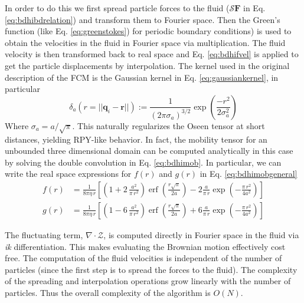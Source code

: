 \documentclass[ twoside,openright,titlepage,numbers=noenddot,%
headinclude,footinclude,cleardoublepage=empty,abstract=on,
BCOR=5mm,paper=b5,fontsize=11pt, dvipsnames
]{scrreprt}
\renewcommand{\vec}[1]{\bm{#1}}
\newcommand{\oper}[1]{\mathcal{#1}}
\DeclareMathOperator{\erf}{erf}
\newcommand{\ppos}{q}
\newcommand{\fpos}{r}
\begin{document}
In order to do this we first spread particle forces to the fluid ($\oper{S}\vec{F}$ in Eq. \eqref{eq:bdhibdrelation}) and transform them to Fourier space. Then the Green's function (like Eq. \eqref{eq:greenstokes}) for periodic boundary conditions) is used to obtain the velocities in the fluid in Fourier space via multiplication. The fluid velocity is then transformed back to real space and Eq. \eqref{eq:bdhifvel} is applied to get the particle displacements by interpolation.
The kernel used in the original description of the \gls{FCM} is the Gaussian kernel in Eq. \eqref{eq:gaussiankernel}, in particular
\begin{equation}
  \label{eq:fcmkernel}
  \delta_a(r = ||\vec{\ppos}_i - \vec{\fpos}||) := \frac{1}{(2\pi\sigma_a)^{3/2}}\exp\left(\frac{-r^2}{2\sigma_a^2}\right)
\end{equation}
Where $\sigma_a = a/\sqrt{\pi}$. This naturally regularizes the Oseen tensor at short distances, yielding \gls{RPY}-like behavior. In fact, the mobility tensor for an unbounded three dimensional domain can be computed analytically in this case by solving the double convolution in Eq. \eqref{eq:bdhimob}. In particular, we can write the real space expressions for $f(r)$ and $g(r)$ in Eq. \eqref{eq:bdhimobgeneral}
\begin{equation}
  \label{eq:fcmmob}
  \begin{aligned}
f(r) & =  \frac{1}{8\pi\eta\,r}\left[\left(1+2\,\frac{a^{2}}{\pi\,r^{2}}\right){\erf}\left(\frac{r\sqrt{\pi}}{2a}\right)-2\frac{a}{\pi\,r}\exp\left(-\frac{\pi\,r^{2}}{4a^{2}}\right)\right]\\
g(r) & =  \frac{1}{8\pi\eta\,r}\left[\left(1-6\,\frac{a^{2}}{\pi\,r^{2}}\right){\erf}\left(\frac{r\sqrt{\pi}}{2a}\right)+6\frac{a}{\pi\,r}\exp\left(-\frac{\pi\,r^{2}}{4a^{2}}\right)\right]
  \end{aligned}
\end{equation}

The fluctuating term, $\nabla\cdot\mathcal{Z}$, is computed directly in Fourier space in the fluid via \emph{ik} differentiation. This makes evaluating the Brownian motion effectively cost free.
The computation of the fluid velocities is independent of the number of particles (since the first step is to spread the forces to the fluid). The complexity of the spreading and interpolation operations grow linearly with the number of particles. Thus the overall complexity of the algorithm is $O(N)$.
\end{document}
